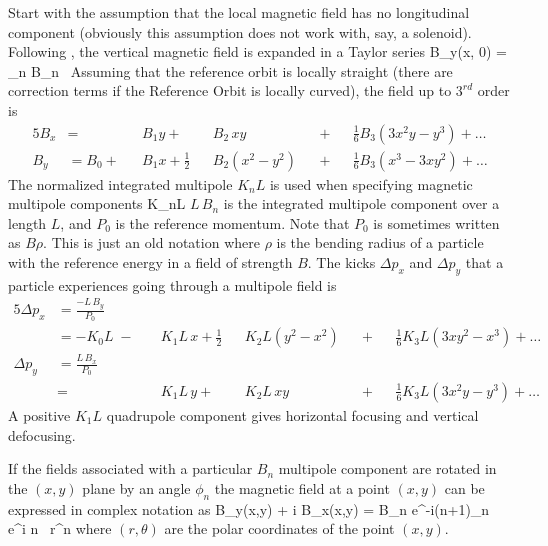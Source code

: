 Start with the assumption that the local magnetic field has no
longitudinal component (obviously this assumption does not work with,
say, a solenoid).  Following \mad, the vertical magnetic field is
expanded in a Taylor series
\Begineq
  B_y(x, 0) = \sum_n B_n \, 
\Endeq
Assuming that the reference orbit is locally straight 
(there are correction terms if the Reference Orbit is locally curved), the 
field up to $3^{rd}$ order is
\begin{alignat}{5}
  B_x &=           &&B_1 y \plus         &&B_2 \, xy       && \plus && \frac{1}{6} B_3 (3x^2 y - y^3) \plus \ldots \\
  B_y &= B_0 \plus &&B_1 x + \frac{1}{2} &&B_2 (x^2 - y^2) && \plus && \frac{1}{6} B_3 (x^3 - 3x y^2) \plus \ldots
\end{alignat}
The normalized integrated multipole $K_nL$ is used when specifying magnetic
multipole components
\Begineq
  K_nL \equiv {}
\Endeq
$L \, B_n$ is the integrated multipole component over a length $L$,
and $P_0$ is the reference momentum. Note that $P_0$ is sometimes
written as $B\rho$. This is just an old notation where $\rho$ is the
bending radius of a particle with the reference energy in a field of
strength $B$. The kicks $\Delta p_x$ and $\Delta p_y$ that a
particle experiences going through a multipole field is
\begin{alignat}{5}
  \Delta p_x & = \frac{-L \, B_y}{P_0} \\
             & = -K_0 L \;-\; 
             && K_1 L \, x \plus 
             \frac{1}{2} && K_2 L (y^2 - x^2) && \plus 
             && \frac{1}{6} K_3 L (3x y^2 - x^3) \plus \ldots \nonumber \\
  \Delta p_y & = \frac{L \, B_x}{P_0} \\
             & =     
             && K_1 L \, y \plus 
             && K_2 L \, xy && \plus 
             && \frac{1}{6} K_3L (3x^2 y - y^3) \plus \ldots \nonumber 
\end{alignat}
A positive $K_1L$ quadrupole component gives
horizontal focusing and vertical defocusing. 

If the fields associated with a particular $B_n$ multipole component
are rotated in the $(x, y)$ plane by an angle $\phi_n$ the magnetic
field at a point $(x,y)$ can be expressed in complex notation as
\Begineq
  B_y(x,y) + i B_x(x,y) = 
                 B_n e^{-i(n+1)\phi_n} \, e^{i n \theta} \, r^n 
\Endeq
where $(r, \theta)$ are the polar coordinates of the point $(x, y)$.

